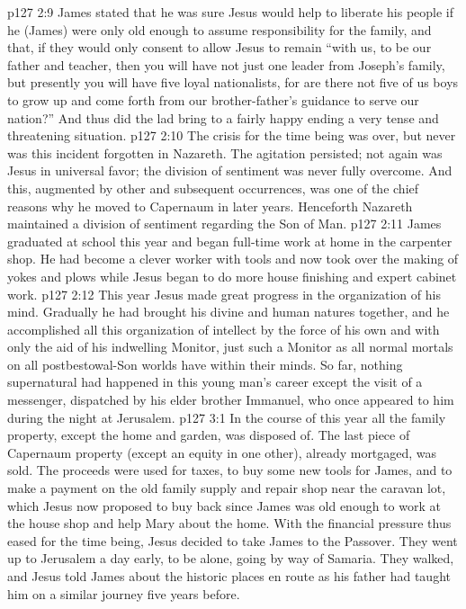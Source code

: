 \vs p127 2:9 James stated that he was sure Jesus would help to liberate his people if he (James) were only old enough to assume responsibility for the family, and that, if they would only consent to allow Jesus to remain “with us, to be our father and teacher, then you will have not just one leader from Joseph’s family, but presently you will have five loyal nationalists, for are there not five of us boys to grow up and come forth from our brother\hyp{}father’s guidance to serve our nation?” And thus did the lad bring to a fairly happy ending a very tense and threatening situation.
\vs p127 2:10 The crisis for the time being was over, but never was this incident forgotten in Nazareth. The agitation persisted; not again was Jesus in universal favor; the division of sentiment was never fully overcome. And this, augmented by other and subsequent occurrences, was one of the chief reasons why he moved to Capernaum in later years. Henceforth Nazareth maintained a division of sentiment regarding the Son of Man.
\pc \vs p127 2:11 James graduated at school this year and began full\hyp{}time work at home in the carpenter shop. He had become a clever worker with tools and now took over the making of yokes and plows while Jesus began to do more house finishing and expert cabinet work.
\pc \vs p127 2:12 This year Jesus made great progress in the organization of his mind. Gradually he had brought his divine and human natures together, and he accomplished all this organization of intellect by the force of his own  and with only the aid of his indwelling Monitor, just such a Monitor as all normal mortals on all postbestowal\hyp{}Son worlds have within their minds. So far, nothing supernatural had happened in this young man’s career except the visit of a messenger, dispatched by his elder brother Immanuel, who once appeared to him during the night at Jerusalem.
\vs p127 3:1 In the course of this year all the family property, except the home and garden, was disposed of. The last piece of Capernaum property (except an equity in one other), already mortgaged, was sold. The proceeds were used for taxes, to buy some new tools for James, and to make a payment on the old family supply and repair shop near the caravan lot, which Jesus now proposed to buy back since James was old enough to work at the house shop and help Mary about the home. With the financial pressure thus eased for the time being, Jesus decided to take James to the Passover. They went up to Jerusalem a day early, to be alone, going by way of Samaria. They walked, and Jesus told James about the historic places en route as his father had taught him on a similar journey five years before.
